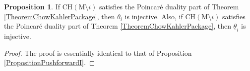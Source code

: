 \documentclass[11pt,reqno]{amsart}
\theoremstyle{definition}
\newtheorem{proposition}[theorem]{Proposition}
\theoremstyle{remark}
\newtheorem{remark}[theorem]{Remark}
\renewcommand{\(}{\left(}
\renewcommand{\)}{\right)}
\newcommand{\<}{\left<}
\renewcommand{\>}{\right>}
\begin{document}

\begin{proposition}\label{DeletionInjection}
If $\mathrm{CH}(\mathrm{M} \setminus i)$ satisfies the Poincar\'e duality part of Theorem \ref{TheoremChowKahlerPackage}, then $\theta_i$ is injective.  Also, if $\underline{\mathrm{CH}}(\mathrm{M} \setminus i)$ satisfies the Poincar\'e duality part of Theorem \ref{TheoremChowKahlerPackage},
then $\underline{\theta}_i$ is injective.
\end{proposition}

\begin{proof}
The proof is essentially identical to that of Proposition \ref{PropositionPushforwardI}.
\end{proof}
\end{document}
